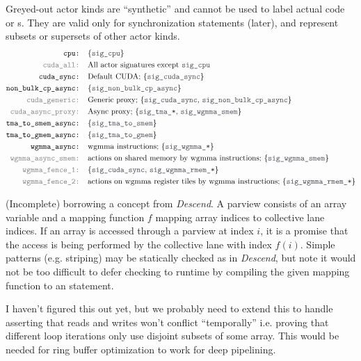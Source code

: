 \filbreak
{} Greyed-out actor kinds are ``synthetic'' and cannot be used to label actual code or s.
They are valid only for synchronization statements (later), and represent subsets or supersets of other actor kinds.
\begin{align*}
\texttt{cpu: } & \{\lighttt{sig\_cpu}\}\\
\graytt{cuda\_all: } & \text{All actor signatures except \lighttt{sig\_cpu}}\\
\texttt{cuda\_sync: } & \text{Default CUDA; \{\lighttt{sig\_cuda\_sync}\}}\\
\texttt{non\_bulk\_cp\_async: } & \{\lighttt{sig\_non\_bulk\_cp\_async}\}\\
\graytt{cuda\_generic: } & \text{Generic proxy; \{\lighttt{sig\_cuda\_sync}, \lighttt{sig\_non\_bulk\_cp\_async}\}}\\
\graytt{cuda\_async\_proxy: } & \text{Async proxy; \{\lighttt{sig\_tma\_*}, \lighttt{sig\_wgmma\_smem}\}}\\
\texttt{tma\_to\_smem\_async: } & \text{\{\lighttt{sig\_tma\_to\_smem}\}}\\
\texttt{tma\_to\_gmem\_async: } & \text{\{\lighttt{sig\_tma\_to\_gmem}\}}\\
\texttt{wgmma\_async: } & \text{wgmma instructions; \{\lighttt{sig\_wgmma\_*}\}}\\
\graytt{wgmma\_async\_smem: } & \text{actions on shared memory by wgmma instructions; \{\lighttt{sig\_wgmma\_smem}\}}\\
\graytt{wgmma\_fence\_1: } & \text{\{\lighttt{sig\_cuda\_sync}, \lighttt{sig\_wgmma\_rmem\_*}\}}\\
\graytt{wgmma\_fence\_2: } & \text{actions on wgmma register tiles by wgmma instructions; \{\lighttt{sig\_wgmma\_rmem\_*}\}}\\
\end{align*}

\filbreak
{} (Incomplete) borrowing a concept from \textit{Descend}.
A parview consists of an array variable and a mapping function $f$ mapping array indices to collective lane indices.
If an array is accessed through a parview at index $i$, it is a promise that the access is being performed by the collective lane with index $f(i)$.
Simple patterns (e.g. striping) may be statically checked as in \textit{Descend}, but note it would not be too difficult to defer checking to runtime by compiling the given mapping function to an  statement.

I haven't figured this out yet, but we probably need to extend this to handle asserting that reads and writes won't conflict ``temporally'' i.e. proving that different loop iterations only use disjoint subsets of some array.
This would be needed for ring buffer optimization to work for deep pipelining.


